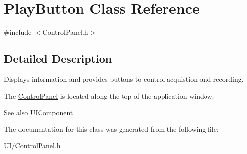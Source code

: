 \hypertarget{classPlayButton}{\section{Play\-Button Class Reference}
\label{classPlayButton}
}


{\ttfamily \#include $<$Control\-Panel.\-h$>$}



\subsection{Detailed Description}
Displays information and provides buttons to control acquistion and recording.

The \hyperlink{classControlPanel}{Control\-Panel} is located along the top of the application window.

\begin{DoxySeeAlso}{See also}
\hyperlink{classUIComponent}{U\-I\-Component} 
\end{DoxySeeAlso}


The documentation for this class was generated from the following file\-:\begin{DoxyCompactItemize}
\item 
U\-I/Control\-Panel.\-h\end{DoxyCompactItemize}
